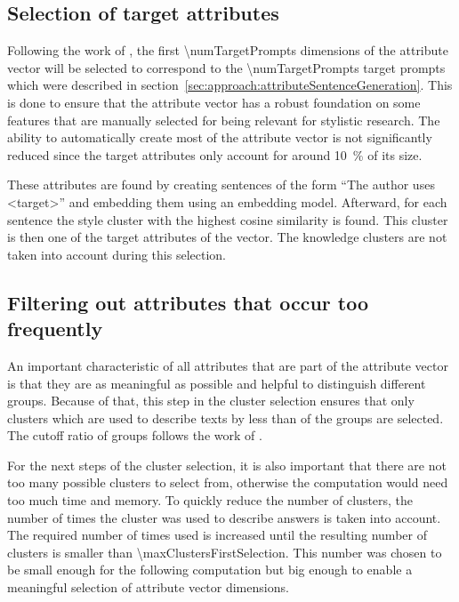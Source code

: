 \subsection{Selection of target attributes}
\label{sec:approach:selection:targetAttributes}
Following the work of \citet{patelLearningInterpretableStyle2023}, the first \num{\numTargetPrompts} dimensions of the attribute vector will be selected to correspond to the \num{\numTargetPrompts} target prompts which were described in section~\ref{sec:approach:attributeSentenceGeneration}.
This is done to ensure that the attribute vector has a robust foundation on some features that are manually selected for being relevant for stylistic research. The ability to automatically create most of the attribute vector is not significantly reduced since the target attributes only account for around \SI{10}{\percent} of its size. %

These attributes are found by creating sentences of the form \enquote{The author uses <target>} and embedding them using an embedding model.
Afterward, for each sentence the style cluster with the highest cosine similarity is found. This cluster is then one of the target attributes of the vector. The knowledge clusters are not taken into account during this selection.


\subsection{Filtering out attributes that occur too frequently}
\label{sec:approach:selection:filteringOccurance}
An important characteristic of all attributes that are part of the attribute vector is that they are as meaningful as possible and helpful to distinguish different groups. Because of that, this step in the cluster selection ensures that only clusters which are used to describe texts by less than \clusterMaxGroupRatio{} of the groups are selected. The cutoff ratio of groups follows the work of \citet{patelLearningInterpretableStyle2023}.

For the next steps of the cluster selection, it is also important that there are not too many possible clusters to select from, otherwise the computation would need too much time and memory. To quickly reduce the number of clusters, the number of times the cluster was used to describe answers is taken into account. The required number of times used is increased until the resulting number of clusters is smaller than \num{\maxClustersFirstSelection}. This number was chosen to be small enough for the following computation but big enough to enable a meaningful selection of attribute vector dimensions.

